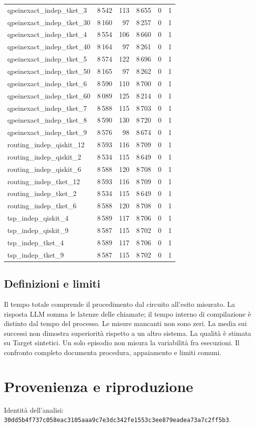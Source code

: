\begin{longtable}{lrrrrr}
qpeinexact\_indep\_tket\_3 & 8\,542 & 113 & 8\,655 & 0 & 1 \\
qpeinexact\_indep\_tket\_30 & 8\,160 & 97 & 8\,257 & 0 & 1 \\
qpeinexact\_indep\_tket\_4 & 8\,554 & 106 & 8\,660 & 0 & 1 \\
qpeinexact\_indep\_tket\_40 & 8\,164 & 97 & 8\,261 & 0 & 1 \\
qpeinexact\_indep\_tket\_5 & 8\,574 & 122 & 8\,696 & 0 & 1 \\
qpeinexact\_indep\_tket\_50 & 8\,165 & 97 & 8\,262 & 0 & 1 \\
qpeinexact\_indep\_tket\_6 & 8\,590 & 110 & 8\,700 & 0 & 1 \\
qpeinexact\_indep\_tket\_60 & 8\,089 & 125 & 8\,214 & 0 & 1 \\
qpeinexact\_indep\_tket\_7 & 8\,588 & 115 & 8\,703 & 0 & 1 \\
qpeinexact\_indep\_tket\_8 & 8\,590 & 130 & 8\,720 & 0 & 1 \\
qpeinexact\_indep\_tket\_9 & 8\,576 & 98 & 8\,674 & 0 & 1 \\
routing\_indep\_qiskit\_12 & 8\,593 & 116 & 8\,709 & 0 & 1 \\
routing\_indep\_qiskit\_2 & 8\,534 & 115 & 8\,649 & 0 & 1 \\
routing\_indep\_qiskit\_6 & 8\,588 & 120 & 8\,708 & 0 & 1 \\
routing\_indep\_tket\_12 & 8\,593 & 116 & 8\,709 & 0 & 1 \\
routing\_indep\_tket\_2 & 8\,534 & 115 & 8\,649 & 0 & 1 \\
routing\_indep\_tket\_6 & 8\,588 & 120 & 8\,708 & 0 & 1 \\
tsp\_indep\_qiskit\_4 & 8\,589 & 117 & 8\,706 & 0 & 1 \\
tsp\_indep\_qiskit\_9 & 8\,587 & 115 & 8\,702 & 0 & 1 \\
tsp\_indep\_tket\_4 & 8\,589 & 117 & 8\,706 & 0 & 1 \\
tsp\_indep\_tket\_9 & 8\,587 & 115 & 8\,702 & 0 & 1 \\
\end{longtable}
\endgroup
\begin{samepage}\subsection{Definizioni e limiti}
Il tempo totale comprende il procedimento dal circuito all’esito misurato. La risposta LLM somma le latenze delle chiamate; il tempo interno di compilazione è distinto dal tempo del processo. Le misure mancanti non sono zeri. La media sui successi non dimostra superiorità rispetto a un altro sistema. La qualità è stimata su Target sintetici. Un solo episodio non misura la variabilità fra esecuzioni. Il confronto completo documenta procedura, appaiamento e limiti comuni.
\par\end{samepage}
\FloatBarrier\section{Provenienza e riproduzione}
Identità dell’analisi: \nolinkurl{30dd5b4f737c058eac3105aaa9c7e3dc342fe1553c3ee879eadea73a7c2ff5b3}.

